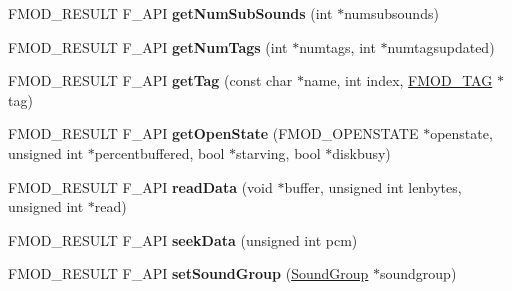 \begin{DoxyCompactItemize}
\item 
\hypertarget{class_f_m_o_d_1_1_sound_ade84503ee47f6c08a1116899c4b59ab7}{F\-M\-O\-D\-\_\-\-R\-E\-S\-U\-L\-T F\-\_\-\-A\-P\-I {\bfseries get\-Num\-Sub\-Sounds} (int $\ast$numsubsounds)}\label{class_f_m_o_d_1_1_sound_ade84503ee47f6c08a1116899c4b59ab7}

\item 
\hypertarget{class_f_m_o_d_1_1_sound_af676bc0be9a87128c8b09f104a4ce31c}{F\-M\-O\-D\-\_\-\-R\-E\-S\-U\-L\-T F\-\_\-\-A\-P\-I {\bfseries get\-Num\-Tags} (int $\ast$numtags, int $\ast$numtagsupdated)}\label{class_f_m_o_d_1_1_sound_af676bc0be9a87128c8b09f104a4ce31c}

\item 
\hypertarget{class_f_m_o_d_1_1_sound_abb0b254a45594e485e95ed4eab9fd1b3}{F\-M\-O\-D\-\_\-\-R\-E\-S\-U\-L\-T F\-\_\-\-A\-P\-I {\bfseries get\-Tag} (const char $\ast$name, int index, \hyperlink{struct_f_m_o_d___t_a_g}{F\-M\-O\-D\-\_\-\-T\-A\-G} $\ast$tag)}\label{class_f_m_o_d_1_1_sound_abb0b254a45594e485e95ed4eab9fd1b3}

\item 
\hypertarget{class_f_m_o_d_1_1_sound_a2c3115f9bd9343b7d3b09b2e4edbb8b3}{F\-M\-O\-D\-\_\-\-R\-E\-S\-U\-L\-T F\-\_\-\-A\-P\-I {\bfseries get\-Open\-State} (F\-M\-O\-D\-\_\-\-O\-P\-E\-N\-S\-T\-A\-T\-E $\ast$openstate, unsigned int $\ast$percentbuffered, bool $\ast$starving, bool $\ast$diskbusy)}\label{class_f_m_o_d_1_1_sound_a2c3115f9bd9343b7d3b09b2e4edbb8b3}

\item 
\hypertarget{class_f_m_o_d_1_1_sound_af58de66a892b9e49a513502288cf930b}{F\-M\-O\-D\-\_\-\-R\-E\-S\-U\-L\-T F\-\_\-\-A\-P\-I {\bfseries read\-Data} (void $\ast$buffer, unsigned int lenbytes, unsigned int $\ast$read)}\label{class_f_m_o_d_1_1_sound_af58de66a892b9e49a513502288cf930b}

\item 
\hypertarget{class_f_m_o_d_1_1_sound_ac73572153744ba36367391939cd3bc5e}{F\-M\-O\-D\-\_\-\-R\-E\-S\-U\-L\-T F\-\_\-\-A\-P\-I {\bfseries seek\-Data} (unsigned int pcm)}\label{class_f_m_o_d_1_1_sound_ac73572153744ba36367391939cd3bc5e}

\item 
\hypertarget{class_f_m_o_d_1_1_sound_a6433c4494cbb472ef1d9cf214749dc01}{F\-M\-O\-D\-\_\-\-R\-E\-S\-U\-L\-T F\-\_\-\-A\-P\-I {\bfseries set\-Sound\-Group} (\hyperlink{class_f_m_o_d_1_1_sound_group}{Sound\-Group} $\ast$soundgroup)}\label{class_f_m_o_d_1_1_sound_a6433c4494cbb472ef1d9cf214749dc01}


\end{DoxyCompactItemize}
